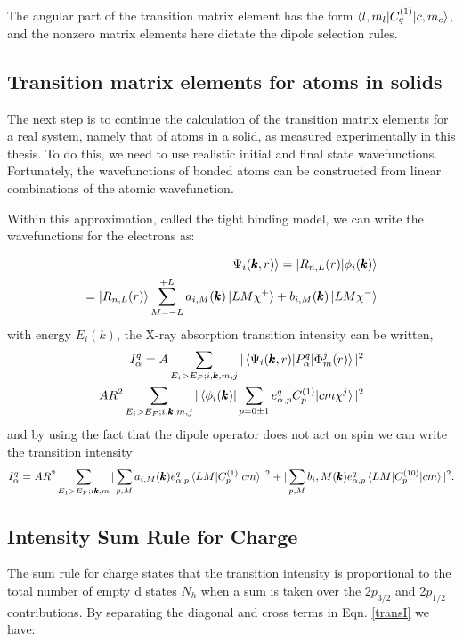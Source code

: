 The angular part of the transition matrix element has the form $\braket{l,m_l|C_q^{(1)}|c,m_c}$, and the nonzero matrix elements here dictate the dipole selection rules.

\subsection{Transition matrix elements for atoms in solids}

The next step is to continue the calculation of the transition matrix elements for a real system, namely that of atoms in a solid, as measured experimentally in this thesis. To do this, we need to use realistic initial and final state wavefunctions. Fortunately, the wavefunctions of bonded atoms can be constructed from linear combinations of the atomic  wavefunction.

Within this approximation, called the tight binding model, we can write the wavefunctions for the electrons as:

\begin{eqnarray}
\ket{\Psi_i(\pmb{k},r)}=\ket{R_{n,L}(r)|\phi_i(\pmb{k})} \\
= \ket{R_{n,L}(r)}\sum^{+L}_{M=-L}a_{i,M}(\pmb{k})\ket{LM\chi^+}+b_{i,M}(\pmb{k})\ket{LM\chi^-}
\end{eqnarray}
with energy $E_i(k)$, the X-ray absorption transition intensity can be written,
\begin{eqnarray}
I_\alpha^q = A\sum_{E_i>E_F; i ,\pmb{k}, m, j} |\braket{\Psi_i(\pmb{k},r)|P_\alpha^q|\Phi_m^j(r)}|^2 \\
A R^2 \sum_{E_i>E_F;i,\pmb{k},m,j}|\braket{\phi_i(\pmb{k})|\sum_{p=0\pm 1}e^q_{\alpha,p}C_p^{(1)}|cm\chi^j}|^2
\end{eqnarray}
and by using the fact that the dipole operator does not act on spin we can write the transition intensity
\begin{eqnarray}
I_\alpha^q=AR^2\sum_{E_1>E_F; i\pmb{k},m}|\sum_{p,M}a_{i,M}(\pmb{k})e_{\alpha,p}^q\braket{LM|C_p^{(1)}|cm}|^2+|\sum_{p,M}b_i,M(\pmb{k})e^q_{\alpha,p}\braket{LM|C_p^{(10)}|cm}|^2.
\label{transI}
\end{eqnarray}

\subsection{Intensity Sum Rule for Charge}

The sum rule for charge states that the transition intensity is proportional to the total number of empty d states $N_h$ when a sum is taken over the 2$p_{3/2}$ and 2$p_{1/2}$ contributions. By separating the diagonal and cross terms in Eqn. \ref{transI} we have:

